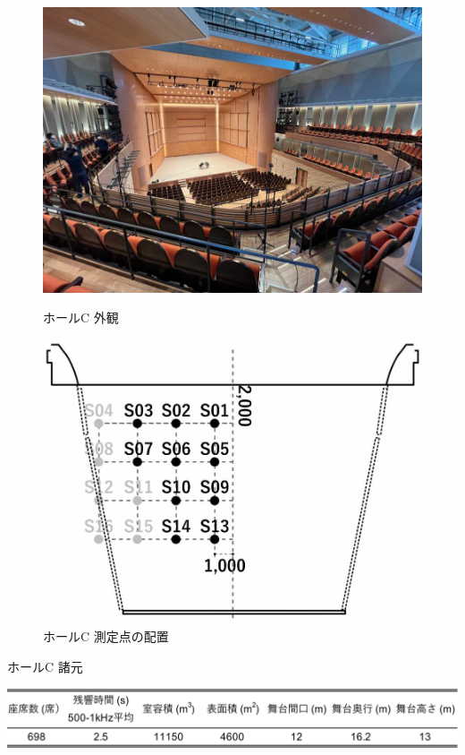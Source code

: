 \documentclass[11pt,a4j]{jreport}
\begin{document}
  \begin{figure}[H]
    \begin{minipage}{.5\linewidth}
      \centering
      \includegraphics[width=.7\linewidth]{images/measuredHalls/resized/picture_c.jpg}
      \caption*{ホールC 外観}  
    \end{minipage}%
    \begin{minipage}{.5\linewidth}
      \centering
      \includegraphics[width=.7\linewidth]{images/measuredHalls/resized/flat_c.jpg}
      \caption*{ホールC 測定点の配置}
    \end{minipage}
  \end{figure}

  \vspace{2\baselineskip}

  \begin{table}[H]
    \centering
    \caption*{ホールC 諸元}
    \includegraphics[width=.8\linewidth]{images/measuredHalls/informationTable/c_wide.pdf}
  \end{table}
\end{document}
